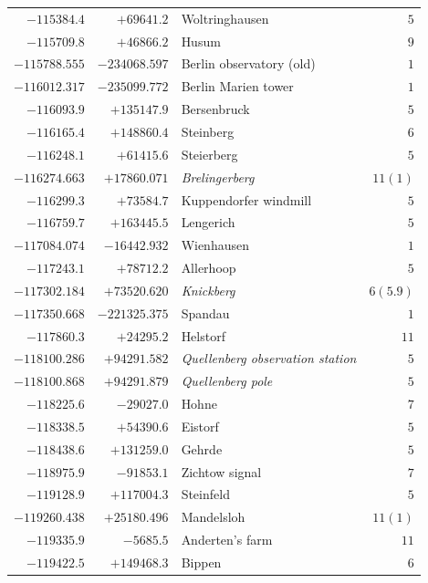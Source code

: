 \begin{center}
\begin{tabular}{r|r|p{170pt}|r}
\(-115384.4\)&\(+69641.2\)&Woltringhausen&\(5\)\\
\(-115709.8\)&\(+46866.2\)&Husum&\(9\)\\
\(-115788.555\)&\(-234068.597\)&Berlin observatory (old)&\(1\)\\
\(-116012.317\)&\(-235099.772\)&Berlin Marien tower&\(1\)\\
\(-116093.9\)&\(+135147.9\)&Bersenbruck&\(5\)\\
\(-116165.4\)&\(+148860.4\)&Steinberg&\(6\)\\
\(-116248.1\)&\(+61415.6\)&Steierberg&\(5\)\\
\(-116274.663\)&\(+17860.071\)&\textit{Brelingerberg}&\(11 (1)\)\\
\(-116299.3\)&\(+73584.7\)&Kuppendorfer windmill&\(5\)\\
\(-116759.7\)&\(+163445.5\)&Lengerich&\(5\)\\
\(-117084.074\)&\(-16442.932\)&Wienhausen&\(1\)\\
\(-117243.1\)&\(+78712.2\)&Allerhoop&\(5\)\\
\(-117302.184\)&\(+73520.620\)&\textit{Knickberg}&\(6(5.9)\)\\
\(-117350.668\)&\(-221325.375\)&Spandau&\(1\)\\
\(-117860.3\)&\(+24295.2\)&Helstorf&\(11\)\\
\(-118100.286\)&\(+94291.582\)&\textit{Quellenberg observation station}&\(5\)\\
\(-118100.868\)&\(+94291.879\)&\textit{Quellenberg pole}&\(5\)\\
\(-118225.6\)&\(-29027.0\)&Hohne&\(7\)\\
\(-118338.5\)&\(+54390.6\)&Eistorf&\(5\)\\
\(-118438.6\)&\(+131259.0\)&Gehrde&\(5\)\\
\(-118975.9\)&\(-91853.1\)&Zichtow signal&\(7\)\\
\(-119128.9\)&\(+117004.3\)&Steinfeld&\(5\)\\
\(-119260.438\)&\(+25180.496\)&Mandelsloh&\(11 (1)\)\\
\(-119335.9\)&\(-5685.5\)&Anderten’s farm&\(11\)\\
\(-119422.5\)&\(+149468.3\)&Bippen&\(6\)\\
\hline\end{tabular}\endgroup\end{center}
\clearpage
